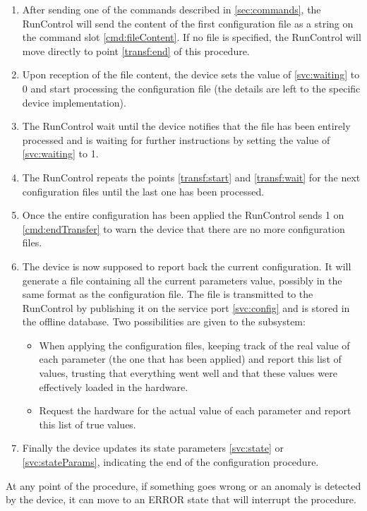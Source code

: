 \documentclass[a4paper]{article}
\begin{document}
\begin{enumerate}
	\item \label{transf:start} After sending one of the commands described in \ref{sec:commands}, the
	RunControl will send the content of the first configuration file as a string on the command slot \ref{cmd:fileContent}. If
	no file is specified, the RunControl will move directly to point \ref{transf:end} of this
	procedure.
	\item Upon reception of the file content, the device sets the value of \ref{svc:waiting} to 0 and
	start processing the configuration file (the details are left to the specific device
	implementation).
	\item \label{transf:wait} The RunControl wait until the device notifies that the file has been
	entirely processed and is waiting for further instructions by setting the value of
	\ref{svc:waiting} to 1.
	\item The RunControl repeats the points \ref{transf:start} and \ref{transf:wait} for the next
	configuration files until the last one has been processed.
	\item \label{transf:end} Once the entire configuration has been applied the RunControl sends 1 on
	\ref{cmd:endTransfer} to warn the device that there are no more configuration files.
	\item The device is now supposed to report back the current configuration. It will generate a file
	containing all the current parameters value, possibly in the same format as the configuration
	file. The file is transmitted to the RunControl by publishing it on the service port
	\ref{svc:config} and is stored in the offline database. Two possibilities are given to the
	subsystem:
	\begin{itemize}
		\item When applying the configuration files, keeping track of the real value of each parameter
		(the one that has been applied) and report this list of values, trusting that everything went
		well and that these values were effectively loaded in the hardware.
		\item Request the hardware for the actual value of each parameter and report this list of true
		values.
	\end{itemize}
	\item Finally the device updates its state parameters \ref{svc:state} or \ref{svc:stateParams},
	indicating the end of the configuration procedure. 
\end{enumerate}
At any point of the procedure, if something goes wrong or an anomaly is detected by the device, it
can move to an ERROR state that will interrupt the procedure. 
\end{document}
